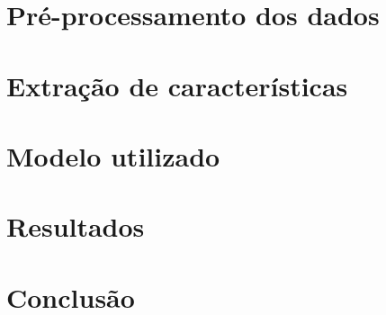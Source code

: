 \documentclass[conference,compsoc]{IEEEtran}
\begin{document}
\section{Pr\'e-processamento dos dados}
\section{Extra\c{c}\~ao de caracter\'isticas} 
\section{Modelo utilizado}
\section{Resultados}
\section{Conclus\~ao}








\ifCLASSOPTIONcompsoc









%
%
%
{}


%
%
%
%
%




\end{document}
